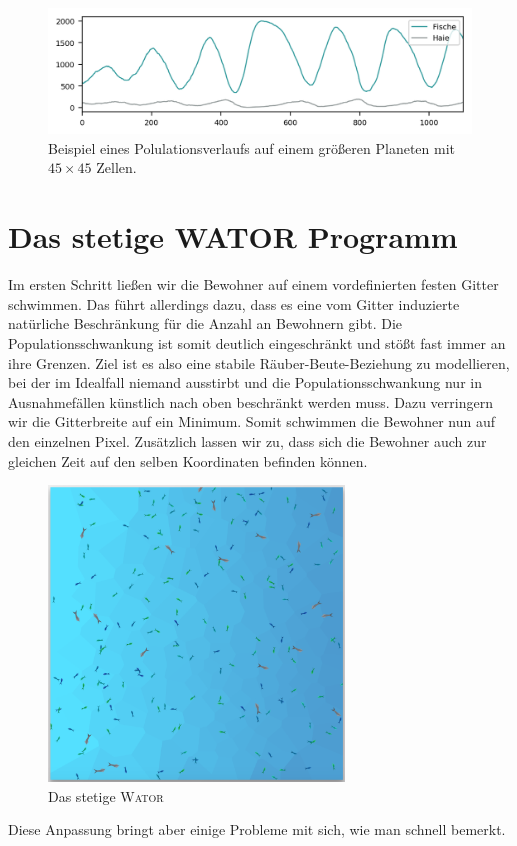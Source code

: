 \documentclass[a4paper,11pt]{article}
\newcommand{\wator}{\textsc{Wator }}
\theoremstyle{definition}
\numberwithin{equation}{section}
\begin{document}
	\begin{figure}
		\centering
		\includegraphics[width=\textwidth]{pictures/classic_big.png}
		\caption{Beispiel eines Polulationsverlaufs auf einem größeren Planeten mit $45 \times 45$ Zellen.}
		\label{fig:classic_big}
	\end{figure}

	\section{Das stetige WATOR Programm}
	Im ersten Schritt ließen wir die Bewohner auf einem vordefinierten festen Gitter schwimmen. Das führt allerdings dazu, dass es eine vom Gitter induzierte natürliche Beschränkung für die Anzahl an Bewohnern gibt. Die Populationsschwankung ist somit deutlich eingeschränkt und stößt fast immer an ihre Grenzen. Ziel ist es also eine stabile Räuber-Beute-Beziehung zu modellieren, bei der im Idealfall niemand ausstirbt und die Populationsschwankung nur in Ausnahmefällen künstlich nach oben beschränkt werden muss.
	Dazu verringern wir die Gitterbreite auf ein Minimum. Somit schwimmen die Bewohner nun auf den einzelnen Pixel. Zusätzlich lassen wir zu, dass sich die Bewohner auch zur gleichen Zeit auf den selben Koordinaten befinden können.
	\begin{figure}
		\centering
		\includegraphics[width=0.7\textwidth]{pictures/continuous.png}
		\caption{Das stetige \wator}
		\label{fig:continuous}
	\end{figure}
	Diese Anpassung bringt aber einige Probleme mit sich, wie man schnell bemerkt.\newline
	
\end{document}
